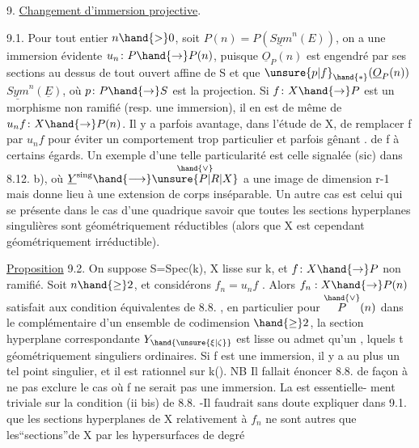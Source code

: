 
9. \uline{Changement d'immersion projective}.

9.1. Pour tout entier $n \hand{>} 0$, soit $P(n) = P(\underline{Sym}^n(E))$, on a une
immersion évidente $u_n\colon P \hand{\to} P(n)$, puisque $\underline{O}_P(n)$ est engendré par
ses sections au dessus de tout ouvert affine de S et que $\unsure{p|f}_{\hand{*}}(\underline{O}_P(n))$
$\underline{Sym}^n(\underline{E})$, où $p\colon P \hand{\to} S$ est la projection. Si $f\colon X\hand{\to} P$ est un morphisme
non ramifié (resp. une immersion), il en est de même de $u_n f\colon X \hand{\to} P(n)$.
Il y a parfois avantage, dans l'étude de X, de  remplacer f par $u_n f$ 
pour éviter un comportement trop particulier et parfois  gênant .
de f à certains égards. Un exemple d'une telle particularité est celle
 signalée (sic) dans 8.12. b),  où $\underline{Y}^{\mathrm{sing}} \hand{\longrightarrow} \overset{\hand{\vee}}{\unsure{P|R|X}}$ a une image de
dimension r-1 mais  donne lieu à une extension
de corps inséparable. Un autre cas est celui qui se présente dans le cas
d'une quadrique  savoir que
toutes les sections hyperplanes singulières sont géométriquement
réductibles (alors que X est cependant géométriquement irréductible).

\uline{Proposition} 9.2. On suppose S=Spec(k), X lisse sur k, et $f\colon X\hand{\to} P$ non
ramifié. Soit $n \hand{\geq} 2$, et considérons $f_n = u_n f$ . Alors $f_n : X \hand{\to} P(n)$
satisfait aux condition équivalentes de 8.8. , en particulier
pour \hand{$\unsure{\xi|\zeta} \in$} $\overset{\hand{\vee}}{P}(n)$ dans le complémentaire d'un ensemble de codimension $\hand{\geq} 2$,
la section hyperplane correspondante $Y_{\hand{\unsure{\xi|\zeta}}}$ est lisse  ou admet qu'un
, lquels t géométriquement singuliers
ordinaires. Si f est une immersion, il y a au
plus un tel point singulier, et il est rationnel sur k(\hand{$\unsure{\xi|\zeta}$}).
\margin{$\|$} NB Il fallait énoncer 8.8. de façon à  ne pas exclure le
cas où f ne serait pas une immersion. La  est essentielle-%
ment triviale sur la condition (ii bis) de 8.8. -Il faudrait sans doute
expliquer dans 9.1. que les sections hyperplanes de X relativement à
 $f_n$ ne sont autres que les``sections''de X par les hypersurfaces de degré
